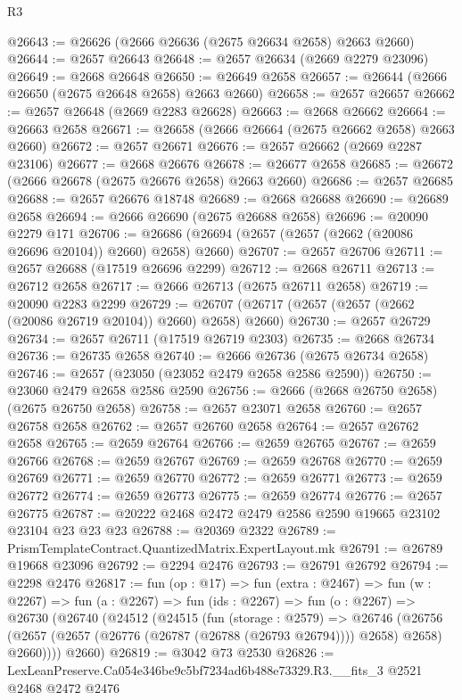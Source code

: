 \begin{lexlean}{R3}
\begin{coremodule}
@26643 := @26626 (@2666 @26636 (@2675 @26634 @2658) @2663 @2660)
@26644 := @2657 @26643
@26648 := @2657 @26634 (@2669 @2279 @23096)
@26649 := @2668 @26648
@26650 := @26649 @2658
@26657 := @26644 (@2666 @26650 (@2675 @26648 @2658) @2663 @2660)
@26658 := @2657 @26657
@26662 := @2657 @26648 (@2669 @2283 @26628)
@26663 := @2668 @26662
@26664 := @26663 @2658
@26671 := @26658 (@2666 @26664 (@2675 @26662 @2658) @2663 @2660)
@26672 := @2657 @26671
@26676 := @2657 @26662 (@2669 @2287 @23106)
@26677 := @2668 @26676
@26678 := @26677 @2658
@26685 := @26672 (@2666 @26678 (@2675 @26676 @2658) @2663 @2660)
@26686 := @2657 @26685
@26688 := @2657 @26676 @18748
@26689 := @2668 @26688
@26690 := @26689 @2658
@26694 := @2666 @26690 (@2675 @26688 @2658)
@26696 := @20090 @2279 @171
@26706 := @26686 (@26694 (@2657 (@2657 (@2662 (@20086 @26696 @20104)) @2660) @2658) @2660)
@26707 := @2657 @26706
@26711 := @2657 @26688 (@17519 @26696 @2299)
@26712 := @2668 @26711
@26713 := @26712 @2658
@26717 := @2666 @26713 (@2675 @26711 @2658)
@26719 := @20090 @2283 @2299
@26729 := @26707 (@26717 (@2657 (@2657 (@2662 (@20086 @26719 @20104)) @2660) @2658) @2660)
@26730 := @2657 @26729
@26734 := @2657 @26711 (@17519 @26719 @2303)
@26735 := @2668 @26734
@26736 := @26735 @2658
@26740 := @2666 @26736 (@2675 @26734 @2658)
@26746 := @2657 (@23050 (@23052 @2479 @2658 @2586 @2590))
@26750 := @23060 @2479 @2658 @2586 @2590
@26756 := @2666 (@2668 @26750 @2658) (@2675 @26750 @2658)
@26758 := @2657 @23071 @2658
@26760 := @2657 @26758 @2658
@26762 := @2657 @26760 @2658
@26764 := @2657 @26762 @2658
@26765 := @2659 @26764
@26766 := @2659 @26765
@26767 := @2659 @26766
@26768 := @2659 @26767
@26769 := @2659 @26768
@26770 := @2659 @26769
@26771 := @2659 @26770
@26772 := @2659 @26771
@26773 := @2659 @26772
@26774 := @2659 @26773
@26775 := @2659 @26774
@26776 := @2657 @26775
@26787 := @20222 @2468 @2472 @2479 @2586 @2590 @19665 @23102 @23104 @23 @23 @23
@26788 := @20369 @2322
@26789 := PrismTemplateContract.QuantizedMatrix.ExpertLayout.mk
@26791 := @26789 @19668 @23096
@26792 := @2294 @2476
@26793 := @26791 @26792
@26794 := @2298 @2476
@26817 := fun (op : @17) =>
  fun (extra : @2467) =>
  fun (w : @2267) =>
  fun (a : @2267) =>
  fun (ids : @2267) =>
  fun (o : @2267) =>
  @26730
    (@26740
      (@24512
        (@24515
          (fun (storage : @2579) =>
          @26746
            (@26756 (@2657 (@2657 (@26776 (@26787 (@26788 (@26793 @26794)))) @2658) @2658) @2660))))
      @2660)
@26819 := @3042 @73 @2530
@26826 := LexLeanPreserve.Ca054e346be9c5bf7234ad6b488e73329.R3.__fits_3
    @2521
    @2468
    @2472
    @2476

\end{coremodule}
\end{lexlean}
